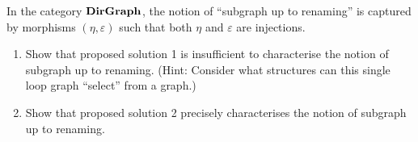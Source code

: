 \begin{exercise}
In the category $\mathbf {DirGraph}$, the notion of ``subgraph up to renaming'' is
captured by morphisms $(\eta,\varepsilon)$ such that both $\eta$ and
$\varepsilon$ are injections.
\begin{enumerate}
  \item 
    Show that proposed solution 1 is insufficient to characterise the notion
    of subgraph up to renaming.  (Hint: Consider what structures can this
    single loop graph ``select'' from a graph.)
  \item
    Show that proposed solution 2 precisely characterises the notion of
    subgraph up to renaming.
\end{enumerate}
\end{exercise}


